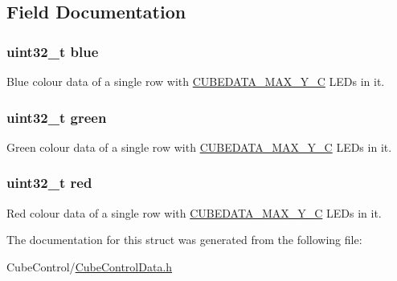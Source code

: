 \subsection{Field Documentation}
\hypertarget{structRowData__t_a3e56de02abd941af2445699dbde7151f}{}
\subsubsection[{blue}]{\setlength{\rightskip}{0pt plus 5cm}uint32\+\_\+t blue}\label{structRowData__t_a3e56de02abd941af2445699dbde7151f}
Blue colour data of a single row with \hyperlink{CubeControlData_8h_ad81929089053d6c5d380dbbce3832272}{C\+U\+B\+E\+D\+A\+T\+A\+\_\+\+M\+A\+X\+\_\+\+Y\+\_\+\+C} L\+E\+Ds in it. \hypertarget{structRowData__t_a80d348ad378ca0edf433f68bba488fbe}{}
\subsubsection[{green}]{\setlength{\rightskip}{0pt plus 5cm}uint32\+\_\+t green}\label{structRowData__t_a80d348ad378ca0edf433f68bba488fbe}
Green colour data of a single row with \hyperlink{CubeControlData_8h_ad81929089053d6c5d380dbbce3832272}{C\+U\+B\+E\+D\+A\+T\+A\+\_\+\+M\+A\+X\+\_\+\+Y\+\_\+\+C} L\+E\+Ds in it. \hypertarget{structRowData__t_a2b653f0aa4b2ac6738229ea1221c4cc5}{}
\subsubsection[{red}]{\setlength{\rightskip}{0pt plus 5cm}uint32\+\_\+t red}\label{structRowData__t_a2b653f0aa4b2ac6738229ea1221c4cc5}
Red colour data of a single row with \hyperlink{CubeControlData_8h_ad81929089053d6c5d380dbbce3832272}{C\+U\+B\+E\+D\+A\+T\+A\+\_\+\+M\+A\+X\+\_\+\+Y\+\_\+\+C} L\+E\+Ds in it. 

The documentation for this struct was generated from the following file\+:\begin{DoxyCompactItemize}
\item 
Cube\+Control/\hyperlink{CubeControlData_8h}{Cube\+Control\+Data.\+h}\end{DoxyCompactItemize}
